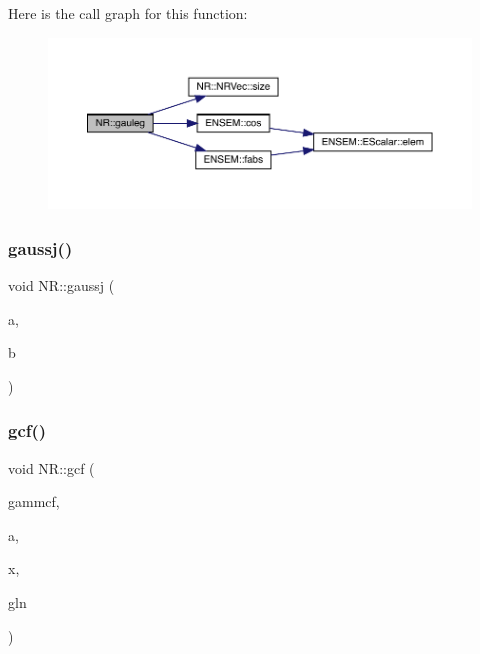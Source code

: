 Here is the call graph for this function\+:
\nopagebreak
\begin{figure}[H]
\begin{center}
\leavevmode
\includegraphics[width=350pt]{da/d46/namespaceNR_a722933d3ddfd7e76e9533892768ae542_cgraph}
\end{center}
\end{figure}
\mbox{\label{namespaceNR_a1d6883edf9183e4e0a4b6be01655b057}} 
\subsubsection{\texorpdfstring{gaussj()}{gaussj()}}
{\footnotesize\ttfamily void N\+R\+::gaussj (\begin{DoxyParamCaption}\item[{\mbox{\hyperlink{namespaceNR_ad1513aa4697878ed3bff0b8b3c9dd910}{Mat\+\_\+\+I\+O\+\_\+\+DP}} \&}]{a,  }\item[{\mbox{\hyperlink{namespaceNR_ad1513aa4697878ed3bff0b8b3c9dd910}{Mat\+\_\+\+I\+O\+\_\+\+DP}} \&}]{b }\end{DoxyParamCaption})}

\mbox{\label{namespaceNR_a54a09ab3536295080e52c4deb5cc42c5}} 
\subsubsection{\texorpdfstring{gcf()}{gcf()}}
{\footnotesize\ttfamily void N\+R\+::gcf (\begin{DoxyParamCaption}\item[{\mbox{\hyperlink{namespaceNR_af6ff762dd605ff477b8e52387253a02a}{DP}} \&}]{gammcf,  }\item[{const \mbox{\hyperlink{namespaceNR_af6ff762dd605ff477b8e52387253a02a}{DP}}}]{a,  }\item[{const \mbox{\hyperlink{namespaceNR_af6ff762dd605ff477b8e52387253a02a}{DP}}}]{x,  }\item[{\mbox{\hyperlink{namespaceNR_af6ff762dd605ff477b8e52387253a02a}{DP}} \&}]{gln }\end{DoxyParamCaption})}

